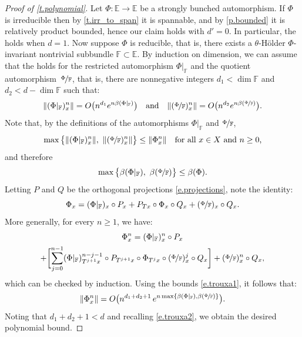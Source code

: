 \documentclass[JEP,XML,SOM,Unicode]{cedram}
\theoremstyle{plain}
\theoremstyle{definition}
\newcommand{\EE}{\mathbb{E}}
\newcommand{\FF}{\mathbb{F}}
\begin{document}
\begin{proof}[Proof of \cref{t.polynomial}]
Let $\Phi \colon \EE \to \EE$ be a strongly bunched automorphism.
If $\Phi$ is irreducible then by \cref{t.irr_to_span} it is spannable, and by \cref{p.bounded} it is relatively product bounded, hence our claim holds with $d'=0$.
In particular, the  holds when $d=1$.
Now suppose $\Phi$ is reducible, that is, there exists a $\theta$-Hölder $\Phi$\nobreakdash-invariant nontrivial subbundle $\FF \subset \EE$.
By induction on dimension, we can assume that the  holds for the restricted automorphism $\Phi|_{\FF}$ and the quotient automorphism~$\nicefrac{\Phi}{\FF}$, that is, there are nonnegative integers $d_1 < \dim \FF$ and $d_2 < d - \dim \FF$ such that:
\begin{equation}\label{e.trouxa1}
\| (\Phi|_\FF)_x^n \| = O \bigl(n^{d_1} e^{n \beta(\Phi|_\FF)} \bigr)
\quad \text{and} \quad
\| (\nicefrac{\Phi}{\FF})_x^n \| = O \bigl(n^{d_2} e^{n \beta(\nicefrac{\Phi}{\FF})} \bigr).
\end{equation}
Note that, by the definitions of the automorphisms $\Phi|_\FF$ and $\nicefrac{\Phi}{\FF}$,
\[
\max \big\{ \| (\Phi|_\FF)_x^n \|, \ \| (\nicefrac{\Phi}{\FF})_x^n \| \big\} \le \| \Phi_x^n \|
\quad \text{for all $x\in X$ and $n \ge 0$,}
\]
and therefore
\begin{equation}\label{e.trouxa2}
\max \big\{ \beta(\Phi|_\FF), \ \beta(\nicefrac{\Phi}{\FF}) \big\} \le \beta(\Phi).
\end{equation}
Letting $P$ and $Q$ be the orthogonal projections \eqref{e.projections}, note the identity:
\[
\Phi_x = (\Phi|_\FF)_x \circ P_x + P_{Tx} \circ \Phi_x \circ Q_x + (\nicefrac{\Phi}{\FF})_x \circ Q_x.
\]
More generally, for every $n \ge 1$, we have:
\begin{multline}\label{e.trouxa3}
\Phi^n_x = (\Phi|_\FF)^n_x \circ P_x\\
+
\biggl[ \sum_{j=0}^{n-1} (\Phi|_\FF)^{n-j-1}_{T^{j+1}x} \circ P_{T^{j+1} x} \circ \Phi_{T^j x} \circ (\nicefrac{\Phi}{\FF})^j_x \circ Q_x \biggr] +
(\nicefrac{\Phi}{\FF})^n_x \circ Q_x,
\end{multline}
which can be checked by induction.
Using the bounds \eqref{e.trouxa1}, it follows that:
\[
\| \Phi_x^n \| = O \bigl(n^{d_1+d_2+1} \, e^{n \max \{ \beta(\Phi|_\FF), \beta(\nicefrac{\Phi}{\FF})\} }\bigr).
\]
Noting that $d_1 + d_2 + 1 < d$ and recalling \eqref{e.trouxa2}, we obtain the desired polynomial bound.
\end{proof}
\end{document}
